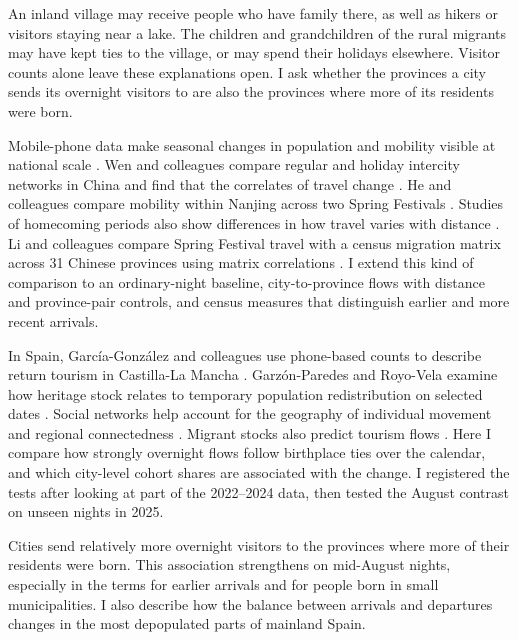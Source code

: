 \documentclass[pdflatex,sn-mathphys-num,referee]{sn-jnl}
\begin{document}
An inland village may receive people who have family there, as well as hikers or visitors staying near a lake. The children and grandchildren of the rural migrants may have kept ties to the village, or may spend their holidays elsewhere. Visitor counts alone leave these explanations open. I ask whether the provinces a city sends its overnight visitors to are also the provinces where more of its residents were born.

Mobile-phone data make seasonal changes in population and mobility visible at national scale \cite{deville2014dynamic,silm2010seasonal,batistaesilva2020uncovering,blondel2015survey}. Wen and colleagues compare regular and holiday intercity networks in China and find that the correlates of travel change \cite{wen2026reframing}. He and colleagues compare mobility within Nanjing across two Spring Festivals \cite{he2026spatiotemporal}. Studies of homecoming periods also show differences in how travel varies with distance \cite{luan2024different,zhao2025effective}. Li and colleagues compare Spring Festival travel with a census migration matrix across 31 Chinese provinces using matrix correlations \cite{li2016spring}. I extend this kind of comparison to an ordinary-night baseline, city-to-province flows with distance and province-pair controls, and census measures that distinguish earlier and more recent arrivals.

In Spain, Garc\'ia-Gonz\'alez and colleagues use phone-based counts to describe return tourism in Castilla-La Mancha \cite{garciagonzalez2024retorno}. Garz\'on-Paredes and Royo-Vela examine how heritage stock relates to temporary population redistribution on selected dates \cite{garzon2026heritage}. Social networks help account for the geography of individual movement and regional connectedness \cite{cho2011friendship,bailey2018social,bailey2020europe,prietocuriel2024diaspora}. Migrant stocks also predict tourism flows \cite{etzo2014migration,santanagallego2022tourism}. Here I compare how strongly overnight flows follow birthplace ties over the calendar, and which city-level cohort shares are associated with the change. I registered the tests after looking at part of the 2022--2024 data, then tested the August contrast on unseen nights in 2025.

Cities send relatively more overnight visitors to the provinces where more of their residents were born. This association strengthens on mid-August nights, especially in the terms for earlier arrivals and for people born in small municipalities. I also describe how the balance between arrivals and departures changes in the most depopulated parts of mainland Spain.
\end{document}
